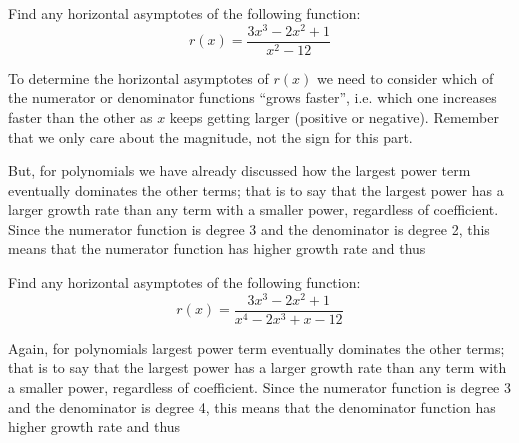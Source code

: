 \documentclass{ximera}
\begin{document}
\begin{example}
    Find any horizontal asymptotes of the following function:
    \[
        r(x) = \frac{3x^3 - 2x^2 + 1}{x^2 - 12}
    \]
    
    To determine the horizontal asymptotes of $r(x)$ we need to consider which of the numerator or denominator functions ``grows faster'', i.e. which one increases faster than the other as $x$ keeps getting larger (positive or negative). Remember that we only care about the magnitude, not the sign for this part.
    
    But, for polynomials we have already discussed how the largest power term eventually dominates the other terms; that is to say that the largest power has a larger growth rate than any term with a smaller power, regardless of coefficient. Since the numerator function is degree 3 and the denominator is degree 2, this means that the numerator function has higher growth rate and thus
    \begin{multipleChoice}
    \end{multipleChoice}
\end{example}


\begin{example}
    Find any horizontal asymptotes of the following function:
    \[
        r(x) = \frac{3x^3 - 2x^2 + 1}{x^4 - 2x^3 + x - 12}
    \]
    
    Again, for polynomials largest power term eventually dominates the other terms; that is to say that the largest power has a larger growth rate than any term with a smaller power, regardless of coefficient. Since the numerator function is degree 3 and the denominator is degree 4, this means that the denominator function has higher growth rate and thus
    \begin{multipleChoice}
    \end{multipleChoice}
\end{example}
\end{document}
